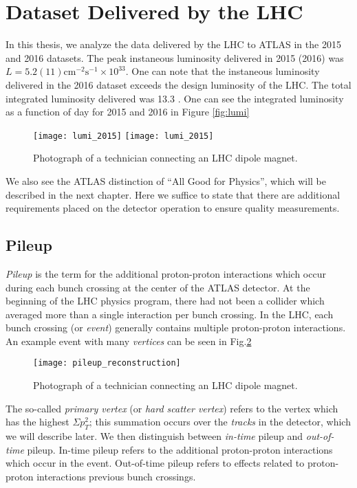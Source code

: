 \section{Dataset Delivered by the LHC}

In this thesis, we analyze the data delivered by the LHC to ATLAS in the 2015 and 2016 datasets.
The peak instaneous luminosity delivered in 2015 (2016) was $L = 5.2 (11) \text{cm}^{-2} \text{s}^{-1} \times 10^33 $.
One can note that the instaneous luminosity delivered in the 2016 dataset exceeds the design luminosity of the LHC.
The total integrated luminosity delivered was 13.3 \ifb.
One can see the integrated luminosity as a function of day for 2015 and 2016 in Figure \ref{fig:lumi}\footnotemark
{}
\begin{figure}
\caption{Photograph of a technician connecting an LHC dipole magnet.}\label{fig}
\texttt{[image: lumi\_2015]}
\texttt{[image: lumi\_2015]}
\end{figure}
We also see the ATLAS distinction of ``All Good for Physics'', which will be described in the next chapter.
Here we suffice to state that there are additional requirements placed on the detector operation to ensure quality measurements.

\subsection{Pileup}

\textit{Pileup} is the term for the additional proton-proton interactions which occur during each bunch crossing at the center of the ATLAS detector.
At the beginning of the LHC physics program, there had not been a collider which averaged more than a single interaction per bunch crossing.
In the LHC, each bunch crossing (or \textit{event})  generally contains multiple proton-proton interactions.
An example event with many \textit{vertices} can be seen in Fig.\ref{fig:pileup_reconstruction}
\begin{figure}
\caption{Photograph of a technician connecting an LHC dipole magnet.}\label{fig:pileup_reconstruction}
\texttt{[image: pileup\_reconstruction]}
\end{figure}
The so-called \textit{primary vertex} (or \textit{hard scatter vertex}) refers to the vertex which has the highest $\Sigma p_T^2$;  this summation occurs over the \textit{tracks} in the detector, which we will describe later.
We then distinguish between \textit{in-time} pileup and \textit{out-of-time} pileup.
In-time pileup refers to the additional proton-proton interactions which occur in the event.
Out-of-time pileup refers to effects related to proton-proton interactions previous bunch crossings.

